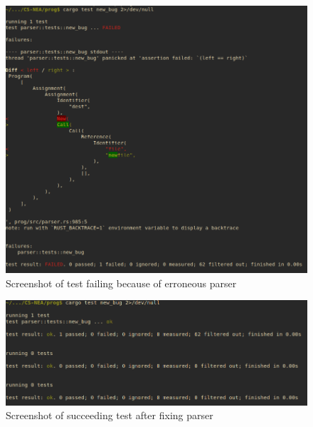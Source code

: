 \documentclass{article}
\begin{document}
\begin{figure}
	\includegraphics[width=\textwidth]{new_bug_fail}
	\caption{Screenshot of test failing because of erroneous parser}
	\label{fig:new_bug_fail}
\end{figure}

\begin{figure}
	\includegraphics[width=\textwidth]{new_bug_success}
	\caption{Screenshot of succeeding test after fixing parser}
	\label{fig:new_bug_success}
\end{figure}
\end{document}
